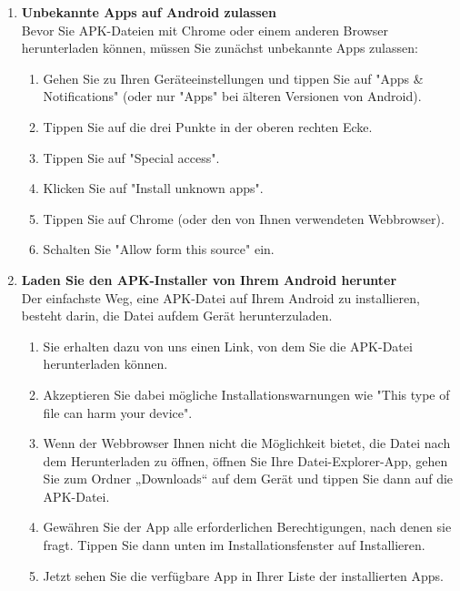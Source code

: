 \begin{enumerate}
    \item \textbf{Unbekannte Apps auf Android zulassen} \\
    Bevor Sie APK-Dateien mit Chrome oder einem anderen Browser herunterladen können, müssen Sie zunächst unbekannte Apps zulassen: 
    \begin{enumerate}
        \item Gehen Sie zu Ihren Geräteeinstellungen und tippen Sie auf "Apps \& Notifications" (oder nur "Apps" bei älteren Versionen von Android). 
        \item Tippen Sie auf die drei Punkte in der oberen rechten Ecke. 
        \item Tippen Sie auf "Special access".  %
        \item Klicken Sie auf "Install unknown apps". 
        \item Tippen Sie auf Chrome (oder den von Ihnen verwendeten Webbrowser). 
        \item Schalten Sie "Allow form this source" ein.  %
    \end{enumerate}
    
    \item \textbf{Laden Sie den APK-Installer von Ihrem Android herunter} \\
    Der einfachste Weg, eine APK-Datei auf Ihrem Android zu installieren, besteht darin, die Datei aufdem Gerät herunterzuladen. 
    \begin{enumerate}
        \item Sie erhalten dazu von uns einen Link, von dem Sie die APK-Datei herunterladen können.
        \item Akzeptieren Sie dabei mögliche Installationswarnungen wie "This type of file can harm your device".
        \item Wenn der Webbrowser Ihnen nicht die Möglichkeit bietet, die Datei nach dem Herunterladen zu öffnen, 
        öffnen Sie Ihre Datei-Explorer-App, gehen Sie zum Ordner „Downloads“ auf dem Gerät und tippen Sie dann auf die APK-Datei. 
        \item Gewähren Sie der App alle erforderlichen Berechtigungen, nach denen sie fragt. Tippen Sie dann unten im Installationsfenster auf Installieren. 


        \item Jetzt sehen Sie die verfügbare App in Ihrer Liste der installierten Apps.
    \end{enumerate}
\end{enumerate}
